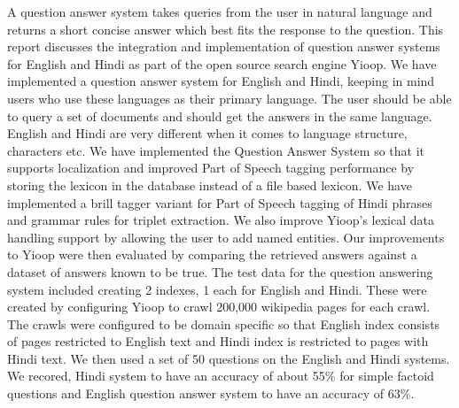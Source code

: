 A question answer system takes queries from the user in natural language and returns a short concise answer which best fits the response to the question. This report discusses the integration and implementation of question answer systems for English and Hindi as part of the  open source search engine Yioop. We have implemented a question answer system for English and Hindi, keeping in mind users who use these languages as their primary language. The user should be able to query a set of  documents and should get the answers in the same language. English and Hindi are very different when it comes to language structure, characters etc. We have implemented the Question Answer System so that it supports localization and improved Part of Speech tagging performance by storing the lexicon in the database instead of a file based lexicon. We have implemented a brill tagger variant for Part of Speech tagging of Hindi phrases and grammar rules for triplet extraction. We also improve Yioop's lexical data handling support by allowing the user to add named entities. Our improvements to Yioop were then evaluated by comparing the retrieved answers against a dataset of answers known to be true. 
The test data for the question answering system included creating 2 indexes, 1 each for English and Hindi. These were created by configuring Yioop to crawl 200,000 wikipedia pages for each crawl. The crawls were configured to be domain specific so that English index consists of pages restricted to English text and Hindi index is restricted to pages with Hindi text. We then used a set of 50 questions on the English and Hindi systems. We recored, Hindi system to have an accuracy of about 55\% for simple factoid questions and English question answer system to have an accuracy of 63\%.